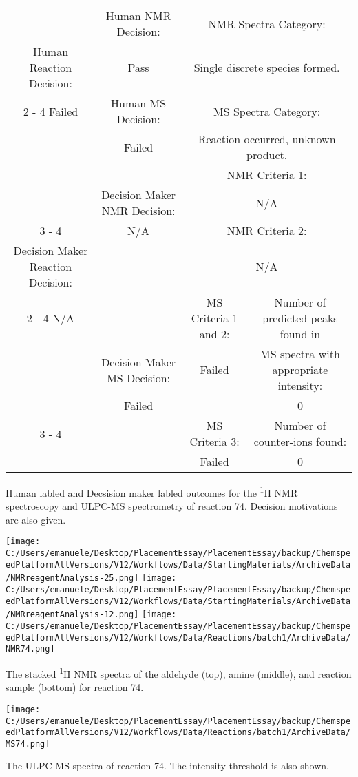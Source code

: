 \documentclass{article}%
\begin{document}
\begin{Decision Table}[H]%
\begin{tabular}{|c|c|c|c|}%
\hline%
&Human NMR Decision:&\multicolumn{2}{|c|}{NMR Spectra Category:}\\%
Human Reaction Decision:&Pass&\multicolumn{2}{|c|}{Single discrete species formed.}\\%
\cline{2%
-%
4}%
Failed&Human MS Decision:&\multicolumn{2}{|c|}{MS Spectra Category:}\\%
&Failed&\multicolumn{2}{|c|}{Reaction occurred, unknown product.}\\%
\hline%
&&\multicolumn{2}{|c|}{NMR Criteria 1:}\\%
&Decision Maker NMR Decision:&\multicolumn{2}{|c|}{N/A}\\%
\cline{3%
-%
4}%
&N/A&\multicolumn{2}{|c|}{NMR Criteria 2:}\\%
Decision Maker Reaction Decision:&&\multicolumn{2}{|c|}{N/A}\\%
\cline{2%
-%
4}%
N/A&&MS Criteria 1 and 2:&Number of predicted peaks found in\\%
&Decision Maker MS Decision:&Failed&MS spectra with appropriate intensity:\\%
&Failed&&0\\%
\cline{3%
-%
4}%
&&MS Criteria 3:&Number of counter{-}ions found:\\%
&&Failed&0\\%
\hline%
\end{tabular}%
\caption{Human labled and Decsision maker labled outcomes for the \textsuperscript{1}H NMR spectroscopy and ULPC-MS spectrometry of reaction 74. Decision motivations are also given.}%
\end{Decision Table}%
\begin{NMR Spectra}[H]%
\begin{center}%
\texttt{[image: C:/Users/emanuele/Desktop/PlacementEssay/PlacementEssay/backup/ChemspeedPlatformAllVersions/V12/Workflows/Data/StartingMaterials/ArchiveData/NMRreagentAnalysis-25.png]}\hfill%
\texttt{[image: C:/Users/emanuele/Desktop/PlacementEssay/PlacementEssay/backup/ChemspeedPlatformAllVersions/V12/Workflows/Data/StartingMaterials/ArchiveData/NMRreagentAnalysis-12.png]}\hfill%
\texttt{[image: C:/Users/emanuele/Desktop/PlacementEssay/PlacementEssay/backup/ChemspeedPlatformAllVersions/V12/Workflows/Data/Reactions/batch1/ArchiveData/NMR74.png]}\hfill%
\end{center}%
\caption{The stacked \textsuperscript{1}H NMR spectra of the aldehyde (top), amine (middle), and reaction sample (bottom) for reaction 74.}%
\end{NMR Spectra}%
\begin{MS Spectra}[H]%
\begin{center}%
\texttt{[image: C:/Users/emanuele/Desktop/PlacementEssay/PlacementEssay/backup/ChemspeedPlatformAllVersions/V12/Workflows/Data/Reactions/batch1/ArchiveData/MS74.png]}\hfill%
\end{center}%
\caption{The ULPC-MS spectra of reaction 74. The intensity threshold is also shown.}%
\end{MS Spectra}%
\end{document}
